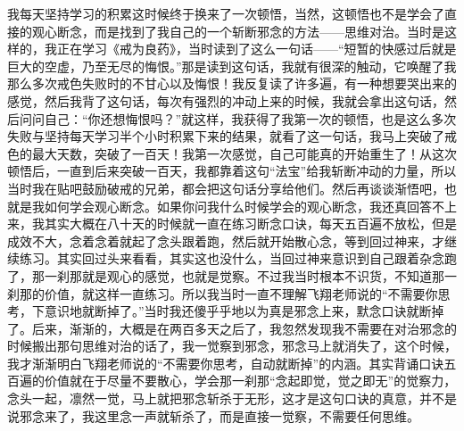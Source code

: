\begin{case}
    我每天坚持学习的积累这时候终于换来了一次顿悟，当然，这顿悟也不是学会了直接的观心断念，而是找到了我自己的一个斩断邪念的方法——思维对治。当时是这样的，我正在学习《戒为良药》，当时读到了这么一句话——“短暂的快感过后就是巨大的空虚，乃至无尽的悔恨。”那是读到这句话，我就有很深的触动，它唤醒了我那么多次戒色失败时的不甘心以及悔恨！我反复读了许多遍，有一种想要哭出来的感觉，然后我背了这句话，每次有强烈的冲动上来的时候，我就会拿出这句话，然后问问自己：“你还想悔恨吗？”就这样，我获得了我第一次的顿悟，也是这么多次失败与坚持每天学习半个小时积累下来的结果，就看了这一句话，我马上突破了戒色的最大天数，突破了一百天！我第一次感觉，自己可能真的开始重生了！从这次顿悟后，一直到后来突破一百天，我都靠着这句“法宝”给我斩断冲动的力量，所以当时我在贴吧鼓励破戒的兄弟，都会把这句话分享给他们。然后再谈谈渐悟吧，也就是我如何学会观心断念。如果你问我什么时候学会的观心断念，我还真回答不上来，我其实大概在八十天的时候就一直在练习断念口诀，每天五百遍不放松，但是成效不大，念着念着就起了念头跟着跑，然后就开始散心念，等到回过神来，才继续练习。其实回过头来看看，其实这也没什么，当回过神来意识到自己跟着杂念跑了，那一刹那就是观心的感觉，也就是觉察。不过我当时根本不识货，不知道那一刹那的价值，就这样一直练习。所以我当时一直不理解飞翔老师说的“不需要你思考，下意识地就断掉了。”当时我还傻乎乎地以为真是邪念上来，默念口诀就断掉了。后来，渐渐的，大概是在两百多天之后了，我忽然发现我不需要在对治邪念的时候搬出那句思维对治的话了，我一觉察到邪念，邪念马上就消失了，这个时候，我才渐渐明白飞翔老师说的“不需要你思考，自动就断掉”的内涵。其实背诵口诀五百遍的价值就在于尽量不要散心，学会那一刹那“念起即觉，觉之即无”的觉察力，念头一起，凛然一觉，马上就把邪念斩杀于无形，这才是这句口诀的真意，并不是说邪念来了，我这里念一声就斩杀了，而是直接一觉察，不需要任何思维。


\end{case}
